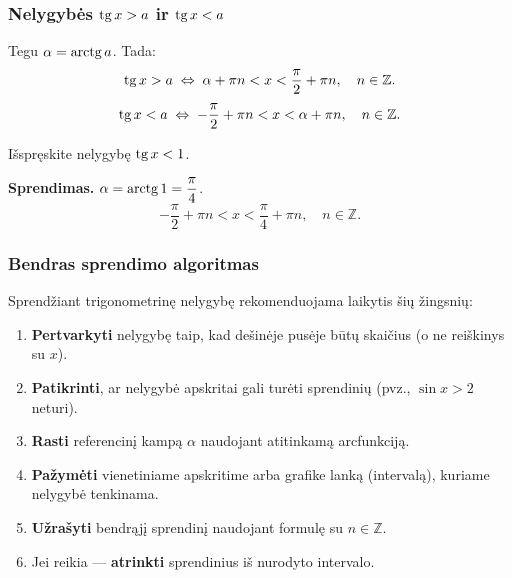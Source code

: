 \subsubsection*{Nelygybės \(\operatorname{tg} x > a\) ir \(\operatorname{tg} x < a\)}

\begin{tcolorbox}[colback=orange!5, colframe=orange!60!black, 
                  title=Sprendimo formulės]
Tegu $\alpha = \operatorname{arctg} a$. Tada:
\[
    \operatorname{tg} x > a \;\Leftrightarrow\; \alpha + \pi n < x < \frac{\pi}{2} + \pi n, 
    \quad n \in \mathbb{Z}.
\]
\[
    \operatorname{tg} x < a \;\Leftrightarrow\; -\frac{\pi}{2} + \pi n < x < \alpha + \pi n, 
    \quad n \in \mathbb{Z}.
\]
\end{tcolorbox}

\begin{example}
Išspręskite nelygybę $\operatorname{tg} x < 1$.

\textbf{Sprendimas.} $\alpha = \operatorname{arctg} 1 = \dfrac{\pi}{4}$.
\[
    -\frac{\pi}{2} + \pi n < x < \frac{\pi}{4} + \pi n, \quad n \in \mathbb{Z}.
\]
\end{example}

\subsubsection*{Bendras sprendimo algoritmas}

Sprendžiant trigonometrinę nelygybę rekomenduojama laikytis šių žingsnių:

\begin{enumerate}
    \item \textbf{Pertvarkyti} nelygybę taip, kad dešinėje pusėje būtų skaičius 
    (o ne reiškinys su $x$).
    \item \textbf{Patikrinti}, ar nelygybė apskritai gali turėti sprendinių 
    (pvz., $\sin x > 2$ neturi).
    \item \textbf{Rasti} referencinį kampą $\alpha$ naudojant atitinkamą arcfunkciją.
    \item \textbf{Pažymėti} vienetiniame apskritime arba grafike lanką (intervalą), 
    kuriame nelygybė tenkinama.
    \item \textbf{Užrašyti} bendrąjį sprendinį naudojant formulę su $n \in \mathbb{Z}$.
    \item Jei reikia --- \textbf{atrinkti} sprendinius iš nurodyto intervalo.
\end{enumerate}

